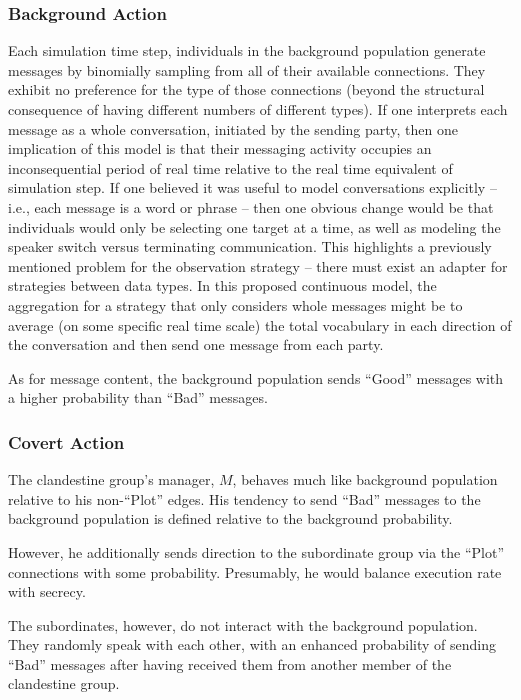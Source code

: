 \documentclass{article}
\begin{document}
\subsubsection*{Background Action}
Each simulation time step, individuals in the background population generate messages by binomially sampling from all of their available connections.  They exhibit no preference for the type of those connections (beyond the structural consequence of having different numbers of different types).  If one interprets each message as a whole conversation, initiated by the sending party, then one implication of this model is that their messaging activity occupies an inconsequential period of real time relative to the real time equivalent of simulation step.  If one believed it was useful to model conversations explicitly -- i.e., each message is a word or phrase -- then one obvious change would be that individuals would only be selecting one target at a time, as well as modeling the speaker switch versus terminating communication.  This highlights a previously mentioned problem for the observation strategy -- there must exist an adapter for strategies between data types.  In this proposed continuous model, the aggregation for a strategy that only considers whole messages might be to average (on some specific real time scale) the total vocabulary in each direction of the conversation and then send one message from each party.

As for message content, the background population sends ``Good'' messages with a higher probability than ``Bad'' messages.

\subsubsection*{Covert Action}
The clandestine group's manager, $M$, behaves much like background population relative to his non-``Plot'' edges.  His tendency to send ``Bad'' messages to the background population is defined relative to the background probability.

However, he additionally sends direction to the subordinate group via the ``Plot'' connections with some probability.  Presumably, he would balance execution rate with secrecy.

The subordinates, however, do not interact with the background population.  They randomly speak with each other, with an enhanced probability of sending ``Bad'' messages after having received them from another member of the clandestine group.
\end{document}
